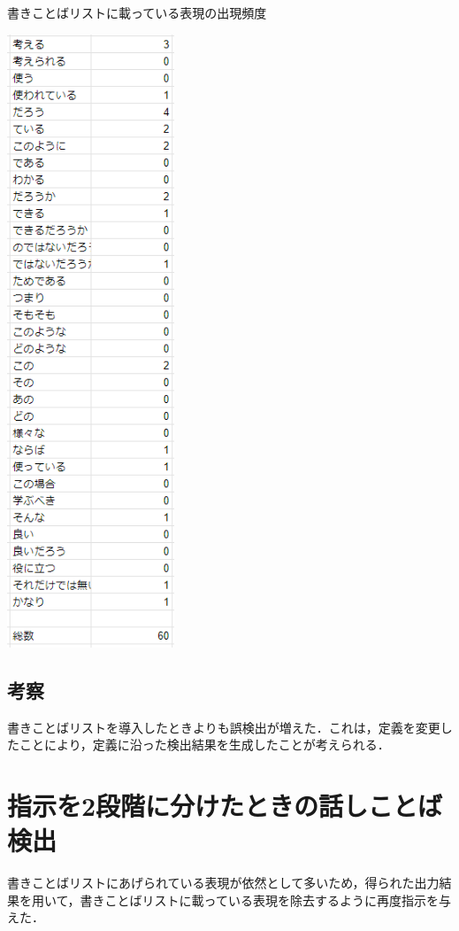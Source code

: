 \begin{table}[H]
	\centering
        \caption{書きことばリストに載っている表現の出現頻度}
 	\includegraphics[width=50mm]{image/kenshutu-ichiran-old.png}
	\label{kenshutu-ichiran-old}
\end{table}

\subsection{考察}
書きことばリストを導入したときよりも誤検出が増えた．これは，定義を変更したことにより，定義に沿った検出結果を生成したことが考えられる．

\section{指示を2段階に分けたときの話しことば検出 \label{c7as1d}}
書きことばリストにあげられている表現が依然として多いため，得られた出力結果を用いて，書きことばリストに載っている表現を除去するように再度指示を与えた．

